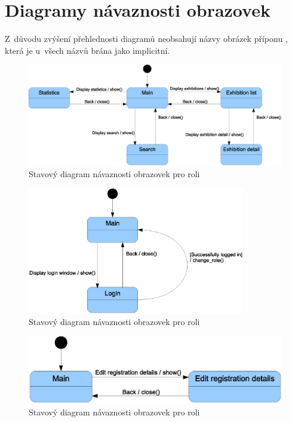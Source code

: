 \pagebreak

\section*{Diagramy návaznosti obrazovek}

Z~důvodu zvýšení přehlednosti diagramů neobsahují názvy obrázek příponu
, která je u~všech názvů brána jako implicitní.

\begin{figure}[h]
	\includegraphics[width=13cm,keepaspectratio]{include/screens_role_user}
	\caption{Stavový diagram návaznosti obrazovek pro roli }
	\label{fig:ScreensRoleUser}
\end{figure}

\begin{figure}[h]
	\includegraphics[width=9.5cm,keepaspectratio]{include/screens_role_visitor}
	\caption{Stavový diagram návaznosti obrazovek pro roli }
	\label{fig:ScreensRoleVisitor}
\end{figure}

\begin{figure}[h]
	\includegraphics[width=12cm,keepaspectratio]{include/screens_role_registered}
	\caption{Stavový diagram návaznosti obrazovek pro roli }
	\label{fig:ScreensRoleRegistered}
\end{figure}

